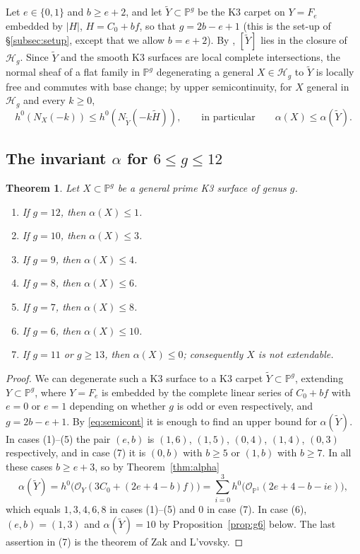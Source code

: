 \documentclass[11pt,reqno]{amsart}
\theoremstyle{plain}
\newtheorem{theorem}{Theorem}[section]
\theoremstyle{definition}
\newcommand{\PP}{\mathbb{P}}
\newcommand{\OO}{\mathcal{O}}
\newcommand{\Yt}{\widetilde{Y}}
\newcommand{\Ht}{\widetilde{H}}
\newcommand{\NYt}{N_{\Yt}}
\begin{document}
Let $e\in\{0,1\}$ and $b\ge e+2$, and let $\Yt\subset\PP^g$ be the K3 carpet on $Y=F_e$ embedded by $|H|$, $H=C_0+bf$, so that $g=2b-e+1$ (this is the set-up of \S\ref{subsec:setup}, except that we allow $b=e+2$). By \cite[Theorems~3.5 and 4.4]{GP97}, $[\Yt]$ lies in the closure of $\mathcal H_g$. Since $\Yt$ and the smooth K3 surfaces are local complete intersections, the normal sheaf of a flat family in $\PP^g$ degenerating a general $X\in\mathcal H_g$ to $\Yt$ is locally free and commutes with base change; by upper semicontinuity, for $X$ general in $\mathcal H_g$ and every $k\ge0$,
\begin{equation}\label{eq:semicont}
h^0(N_X(-k))\le h^0(\NYt(-k\Ht)),\qquad\text{in particular}\qquad \alpha(X)\le\alpha(\Yt).
\end{equation}

\subsection{The invariant \texorpdfstring{$\alpha$}{alpha} for \texorpdfstring{$6\le g\le 12$}{6 <= g <= 12}}

\begin{theorem}\label{thm:alpha-lowgenus}
Let $X\subset\PP^g$ be a general prime K3 surface of genus $g$.
\begin{enumerate}
\item If $g=12$, then $\alpha(X)\le1$.
\item If $g=10$, then $\alpha(X)\le3$.
\item If $g=9$, then $\alpha(X)\le4$.
\item If $g=8$, then $\alpha(X)\le6$.
\item If $g=7$, then $\alpha(X)\le8$.
\item If $g=6$, then $\alpha(X)\le10$.
\item If $g=11$ or $g\ge13$, then $\alpha(X)\le0$; consequently $X$ is not extendable.
\end{enumerate}
\end{theorem}

\begin{proof}
We can degenerate such a K3 surface to a K3 carpet $\Yt\subset\PP^g$, extending $Y\subset\PP^g$, where $Y=F_e$ is embedded by the complete linear series of $C_0+bf$ with $e=0$ or $e=1$ depending on whether $g$ is odd or even respectively, and $g=2b-e+1$. By \eqref{eq:semicont} it is enough to find an upper bound for $\alpha(\Yt)$. In cases (1)--(5) the pair $(e,b)$ is $(1,6)$, $(1,5)$, $(0,4)$, $(1,4)$, $(0,3)$ respectively, and in case (7) it is $(0,b)$ with $b\ge5$ or $(1,b)$ with $b\ge7$. In all these cases $b\ge e+3$, so by Theorem~\ref{thm:alpha}
\[
\alpha(\Yt)=h^0\big(\OO_Y(3C_0+(2e+4-b)f)\big)=\sum_{i=0}^{3}h^0\big(\OO_{\PP^1}(2e+4-b-ie)\big),
\]
which equals $1,3,4,6,8$ in cases (1)--(5) and $0$ in case (7). In case (6), $(e,b)=(1,3)$ and $\alpha(\Yt)=10$ by Proposition~\ref{prop:g6} below. The last assertion in (7) is the theorem of Zak and L'vovsky.
\end{proof}
\end{document}
